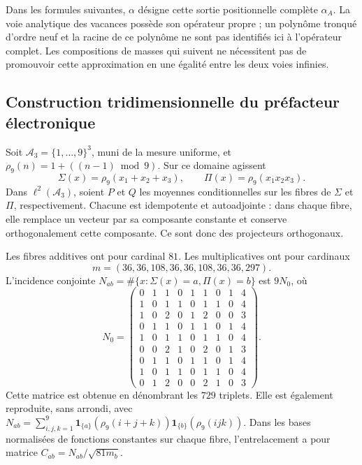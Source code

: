 Dans les formules suivantes, \(\alpha\) désigne cette sortie positionnelle
complète \(\alpha_A\). La voie analytique des vacances possède son opérateur
propre ; un polynôme tronqué d’ordre neuf et la racine de ce polynôme
ne sont pas identifiés ici à l’opérateur complet. Les compositions de
masses qui suivent ne nécessitent pas de promouvoir cette approximation en
une égalité entre les deux voies infinies.

\subsection{Construction tridimensionnelle du préfacteur électronique}
\label{vi:dep:prefactor}

Soit \(\mathcal A_3=\{1,\ldots,9\}^3\), muni de la mesure uniforme, et
\(\rho_9(n)=1+((n-1)\bmod9)\). Sur ce domaine agissent
\[
 \Sigma(x)=\rho_9(x_1+x_2+x_3),\qquad
 \Pi(x)=\rho_9(x_1x_2x_3).
\]
Dans \(\ell^2(\mathcal A_3)\), soient \(P\) et \(Q\) les moyennes
conditionnelles sur les fibres de \(\Sigma\) et \(\Pi\),
respectivement. Chacune est idempotente et autoadjointe : dans chaque
fibre, elle remplace un vecteur par sa composante constante et conserve
orthogonalement cette composante. Ce sont donc des projecteurs orthogonaux.

Les fibres additives ont pour cardinal \(81\). Les multiplicatives ont
pour cardinaux
\[
m=(36,36,108,36,36,108,36,36,297).
\]
L’incidence conjointe
\(N_{ab}=\#\{x:\Sigma(x)=a,\Pi(x)=b\}\) est \(9N_0\), où
\begin{equation}
 N_0=\begin{pmatrix}
0&1&1&0&1&1&0&1&4\\1&0&1&1&0&1&1&0&4\\
1&0&2&0&1&2&0&0&3\\0&1&1&0&1&1&0&1&4\\
1&0&1&1&0&1&1&0&4\\0&0&2&1&0&2&0&1&3\\
0&1&1&0&1&1&0&1&4\\1&0&1&1&0&1&1&0&4\\
0&1&2&0&0&2&1&0&3
\end{pmatrix}.
 \label{vi:dep:incidencia-cubica}
\end{equation}
Cette matrice est obtenue en dénombrant les \(729\) triplets. Elle est également
reproduite, sans arrondi, avec
\(N_{ab}=\sum_{i,j,k=1}^9
\mathbf1_{\{a\}}(\rho_9(i+j+k))
\mathbf1_{\{b\}}(\rho_9(ijk))\).
Dans les bases normalisées de fonctions constantes sur chaque fibre,
l’entrelacement a pour matrice \(C_{ab}=N_{ab}/\sqrt{81m_b}\).

